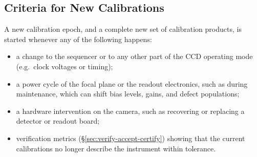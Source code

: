 \subsection{Criteria for New Calibrations} \label{sec:discussion:criteria}
A new calibration epoch, and a complete new set of calibration products, is started whenever any of the following happens:
\begin{itemize}
    \item a change to the sequencer or to any other part of the CCD operating mode (e.g.\ clock voltages or timing);
    \item a power cycle of the focal plane or the readout electronics, such as during maintenance, which can shift bias levels, gains, and defect populations;
    \item a hardware intervention on the camera, such as recovering or replacing a detector or readout board;
    \item verification metrics (\S\ref{sec:verify-accept-certify}) showing that the current calibrations no longer describe the instrument within tolerance.
\end{itemize}

